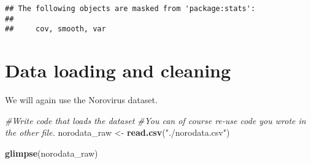 \documentclass[]{article}
\newenvironment{Shaded}{\begin{snugshade}}{\end{snugshade}}
\newcommand{\CommentTok}[1]{\textcolor[rgb]{0.56,0.35,0.01}{\textit{#1}}}
\newcommand{\KeywordTok}[1]{\textcolor[rgb]{0.13,0.29,0.53}{\textbf{#1}}}
\newcommand{\NormalTok}[1]{#1}
\newcommand{\StringTok}[1]{\textcolor[rgb]{0.31,0.60,0.02}{#1}}
\begin{document}
\begin{verbatim}
## The following objects are masked from 'package:stats':
## 
##     cov, smooth, var
\end{verbatim}

\hypertarget{data-loading-and-cleaning}{%
\section{Data loading and cleaning}\label{data-loading-and-cleaning}}

We will again use the Norovirus dataset.

\begin{Shaded}
\begin{Highlighting}[]
\CommentTok{#Write code that loads the dataset }
\CommentTok{#You can of course re-use code you wrote in the other file.}
\NormalTok{norodata_raw <-}\StringTok{ }\KeywordTok{read.csv}\NormalTok{(}\StringTok{"./norodata.csv"}\NormalTok{)}

\KeywordTok{glimpse}\NormalTok{(norodata_raw)}
\end{Highlighting}
\end{Shaded}
\end{document}
